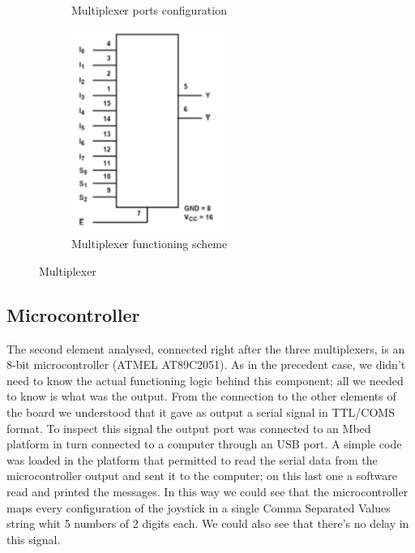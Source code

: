 \documentclass[12pt, a4paper]{article}
\begin{document}
\begin{figure}[h]
\begin{subfigure}[t]{0.2\textwidth}
		\caption{Multiplexer ports configuration}
		\label{fig:rmultiplexer_ports}
	\end{subfigure}
	\hfill%
	\begin{subfigure}[t]{0.2\textwidth}
		\includegraphics[width=\textwidth]{multiplexer_scheme}
		\caption{Multiplexer functioning scheme}
		\label{fig:multiplexer_scheme}
	\end{subfigure}
 	\caption{Multiplexer}
	\label{fig:multi}
\end{figure}
\newpage\subsection{Microcontroller}

The second element analysed, connected right after the three multiplexers, is an 8-bit microcontroller (ATMEL AT89C2051). As in the precedent case, we didn’t need to know the actual functioning logic behind this component; all we needed to know is what was the output. From the connection to the other elements of the board we understood that it gave as output a serial signal in TTL/COMS format. To inspect this signal the output port was connected to an Mbed platform in turn connected to a computer through an USB port. A simple code was loaded in the platform that permitted to read the serial data from the microcontroller output and sent it to the computer; on this last one a software read and printed the messages. In this way we could see that the microcontroller maps every configuration of the joystick in a single Comma Separated Values string whit 5 numbers of 2 digits each. We could also see that there’s no delay in this signal.
\end{document}
